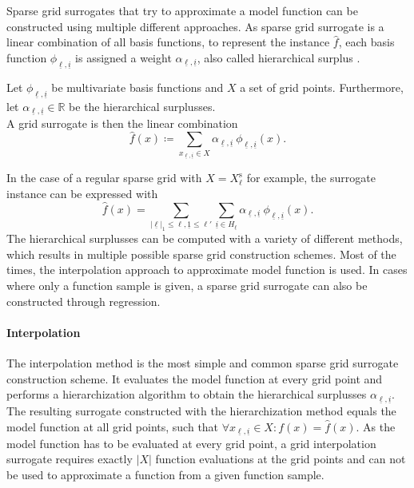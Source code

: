 \documentclass[
  a4paper,  %
  twoside,  %
  bibliography=totoc,
  headsepline,
  cleardoublepage=empty,
  parskip=half,
  draft=false
]{scrbook}
\begin{document}
Sparse grid surrogates that try to approximate a model function can be constructed using multiple different approaches.
As sparse grid surrogate is a linear combination of all basis functions, to represent the instance $\hat{f}$, each basis function $\phi_{\underline{\ell},\underline{i}}$ is assigned a weight $\alpha_{\underline{\ell},\underline{i}}$, also called hierarchical surplus
.
\begin{definition}
Let $\phi_{\underline{\ell},\underline{i}}$ be multivariate basis functions and $X$ a set of grid points.
Furthermore, let $\alpha_{\underline{\ell},\underline{i}} \in \mathds{R}$ be the hierarchical surplusses.\\
A grid surrogate is then the linear combination
\begin{equation}
\hat{f}(x) \coloneqq \sum_{x_{\underline{\ell},\underline{i}} \in X} \alpha_{\underline{\ell},\underline{i}} ~ \phi_{
\underline{\ell},\underline{i}}(x).
\end{equation}
\end{definition}
%
In the case of a regular sparse grid with $X=X^{\mathrm{s}}_{\ell}$ for example, the surrogate instance can be expressed with
\begin{equation}
\hat{f}(x) = \sum_{|\underline{\ell}|_1 \leq \ell, \underline{1} \leq \ell'} \sum_{\underline{i} \in {H_{\underline{\ell}}}} \alpha_{\underline{\ell},\underline{i}} ~ \phi_{
\underline{\ell},\underline{i}}(x).
\end{equation}
%
The hierarchical surplusses can be computed with a variety of different methods, which results in multiple possible sparse grid construction schemes.
Most of the times, the interpolation approach to approximate model function is used.
In cases where only a function sample is given, a sparse grid surrogate can also be constructed through regression.

\paragraph{Interpolation}
The interpolation method is the most simple and common sparse grid surrogate construction scheme.
It evaluates the model function at every grid point and performs a hierarchization algorithm to obtain the hierarchical surplusses $\alpha_{\underline{\ell},\underline{i}}$.
The resulting surrogate constructed with the hierarchization method equals the model function at all grid points, such that $\forall x_{\underline{\ell},\underline{i}} \in X \colon f(x)=\hat{f}(x)$.
As the model function has to be evaluated at every grid point, a grid interpolation surrogate requires exactly $|X|$ function evaluations at the grid points and can not be used to approximate a function from a given function sample.
\end{document}

